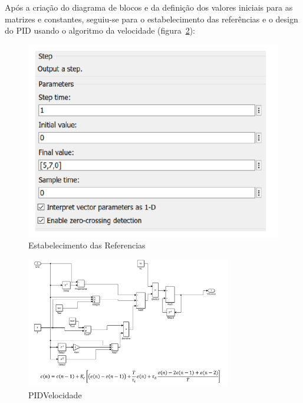 \documentclass[11pt]{article}
\begin{document}
Após a criação do diagrama de blocos e da definição dos valores iniciais para as matrizes e constantes, seguiu-se para o estabelecimento das referências e o design do PID usando o algoritmo da velocidade (figura~\ref{fig:quatro}):
\begin{figure}[!htbp]
	\centering
      		 \includegraphics[page=1,width=1\textwidth]{img/step.png} 
		\caption{Estabelecimento das Referencias}
 	\label{fig:tres}
\end{figure}

\begin{figure}[!htbp]
	\centering
      		 \includegraphics[page=1,width=0.8\textwidth]{img/pid2.png} 
		\caption{PIDVelocidade}
	\label{fig:quatro}
\end{figure}
\end{document}
